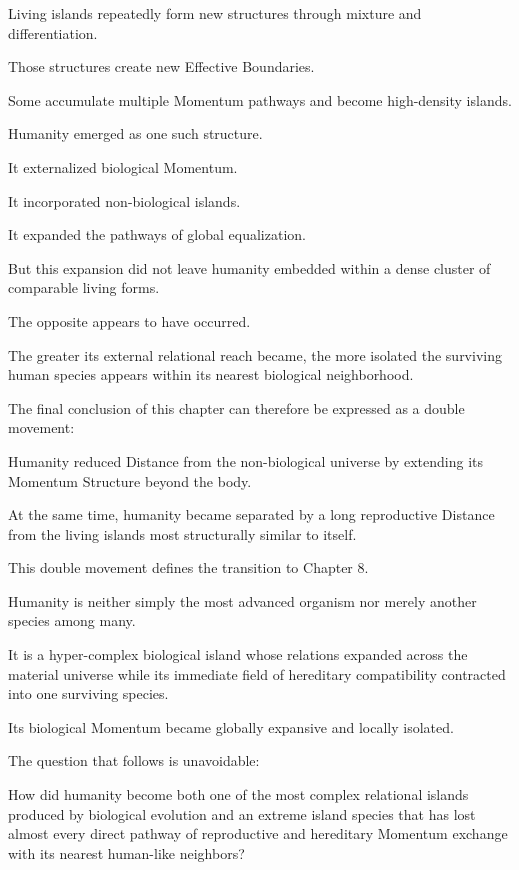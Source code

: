 Living islands repeatedly form new structures through mixture and differentiation.

Those structures create new Effective Boundaries.

Some accumulate multiple Momentum pathways and become high-density islands.

Humanity emerged as one such structure.

It externalized biological Momentum.

It incorporated non-biological islands.

It expanded the pathways of global equalization.

But this expansion did not leave humanity embedded within a dense cluster of comparable living forms.

The opposite appears to have occurred.

The greater its external relational reach became, the more isolated the surviving human species appears within its nearest biological neighborhood.

The final conclusion of this chapter can therefore be expressed as a double movement:

Humanity reduced Distance from the non-biological universe by extending its Momentum Structure beyond the body.

At the same time, humanity became separated by a long reproductive Distance from the living islands most structurally similar to itself.

This double movement defines the transition to Chapter 8.

Humanity is neither simply the most advanced organism nor merely another species among many.

It is a hyper-complex biological island whose relations expanded across the material universe while its immediate field of hereditary compatibility contracted into one surviving species.

Its biological Momentum became globally expansive and locally isolated.

The question that follows is unavoidable:

How did humanity become both one of the most complex relational islands produced by biological evolution and an extreme island species that has lost almost every direct pathway of reproductive and hereditary Momentum exchange with its nearest human-like neighbors?
